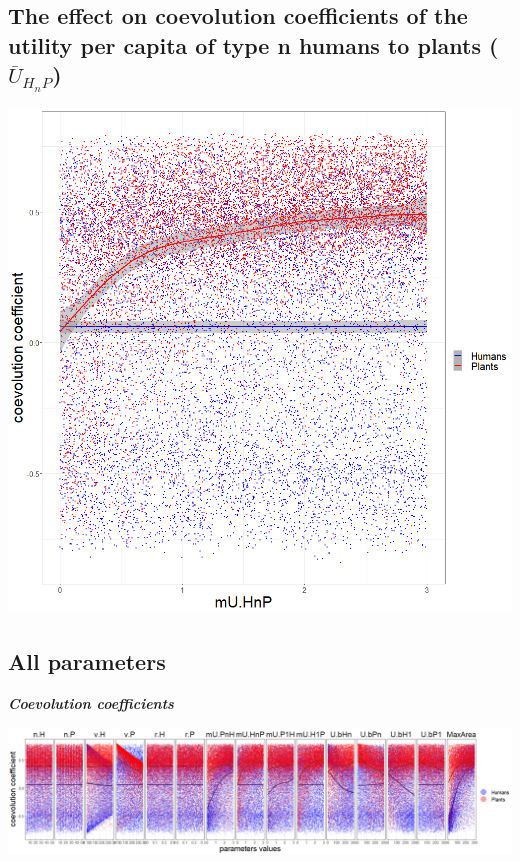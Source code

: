 \documentclass[
]{book}
\begin{document}
\hypertarget{the-effect-on-coevolution-coefficients-of-the-utility-per-capita-of-type-n-humans-to-plants-baru_h_np}{%
\subsection{\texorpdfstring{The effect on coevolution coefficients of the utility per capita of type n humans to plants (\(\bar{U}_{H_{n}P}\))}{The effect on coevolution coefficients of the utility per capita of type n humans to plants (\textbackslash bar\{U\}\_\{H\_\{n\}P\})}}\label{the-effect-on-coevolution-coefficients-of-the-utility-per-capita-of-type-n-humans-to-plants-baru_h_np}}


\includegraphics[width=1\linewidth]{plots/5_multiplePar-coevo_collapsed-ggplot}

\newpage

\hypertarget{all-parameters}{%
\subsection{All parameters}\label{all-parameters}}

\textbf{\emph{Coevolution coefficients}}

\includegraphics[width=1\linewidth]{plots/5_multiplePar-coevo-ggplot}
\end{document}
